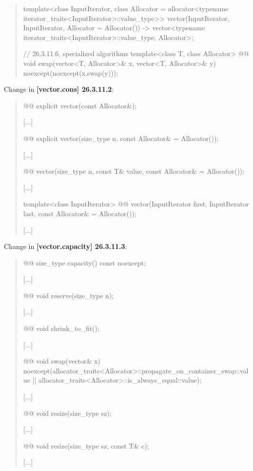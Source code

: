 \documentclass{wg21}
\begin{document}
\begin{quote}
\begin{codeblock}
{  template<class InputIterator,
           class Allocator = allocator<typename iterator_traits<InputIterator>::value_type>>
    vector(InputIterator, InputIterator, Allocator = Allocator())
      -> vector<typename iterator_traits<InputIterator>::value_type, Allocator>;

  // 26.3.11.6, specialized algorithms
  template<class T, class Allocator>
    @@ void swap(vector<T, Allocator>& x, vector<T, Allocator>& y)
      noexcept(noexcept(x.swap(y)));
}
\end{codeblock}%
\end{quote}

Change in \textbf{[vector.cons] 26.3.11.2}:
\begin{quote}
\begin{itemdecl}
@@ explicit vector(const Allocator&);
\end{itemdecl}
[...]
\begin{itemdecl}
@@ explicit vector(size_type n, const Allocator& = Allocator());
\end{itemdecl}
[...]
\begin{itemdecl}
@@ vector(size_type n, const T& value,
                           const Allocator& = Allocator());
\end{itemdecl}
[...]
\begin{itemdecl}
template<class InputIterator>
  @@ vector(InputIterator first, InputIterator last,
                             const Allocator& = Allocator());
\end{itemdecl}
[...]
\end{quote}

Change in \textbf{[vector.capacity] 26.3.11.3}:
\begin{quote}
\begin{itemdecl}
@@ size_type capacity() const noexcept;
\end{itemdecl}
[...]
\begin{itemdecl}
@@ void reserve(size_type n);
\end{itemdecl}
[...]
\begin{itemdecl}
@@ void shrink_to_fit();
\end{itemdecl}
[...]
\begin{itemdecl}
@@ void swap(vector& x)
  noexcept(allocator_traits<Allocator>::propagate_on_container_swap::value ||
           allocator_traits<Allocator>::is_always_equal::value);
\end{itemdecl}
[...]
\begin{itemdecl}
@@ void resize(size_type sz);
\end{itemdecl}
[...]
\begin{itemdecl}
@@ void resize(size_type sz, const T& c);
\end{itemdecl}
[...]
\end{quote}
\end{document}
